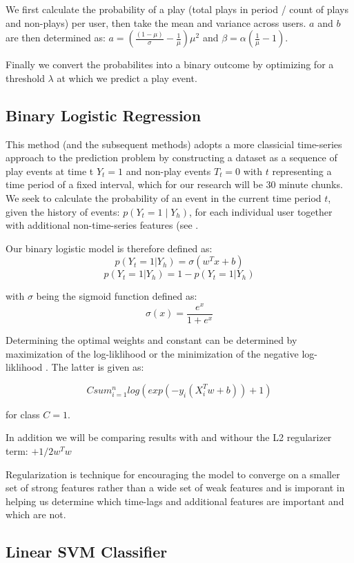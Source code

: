 We first calculate the probability of a play (total plays in period / count of plays and non-plays) per user, then take the mean and variance across users. $a$ and $b$ are then determined as:
$a = (\frac{(1- \mu)}{\sigma} - \frac{1}{\mu}) \mu^2$
and
$\beta=\alpha\left(\frac{1}{\mu}-1\right)$.

Finally we convert the probabilites into a binary outcome by optimizing for a threshold $\lambda$ at which we predict a play event.

\subsection{Binary Logistic Regression}

This method (and the subsequent methods) adopts a more classicial time-series approach to the prediction problem by constructing a dataset as a sequence of play events at time t $Y_t = 1$ and non-play events $T_t = 0$ with $t$ representing a time period of a fixed interval, which for our research will be 30 minute chunks. We seek to calculate the probability of an event in the current time period $t$, given the history of events: $p(Y_t =1 \mid Y_h)$, for each individual user together with additional non-time-series features (see . 

Our binary logistic model is therefore defined as:
$$p(Y_t = 1|Y_h) = \sigma(w^Tx + b)$$
$$p(Y_t = 1|Y_h) = 1 - p(Y_t = 1|Y_h)$$

with $\sigma$ being the sigmoid function defined as:
$$\sigma(x)=\frac{e^x}{1+e^x}$$

Determining the optimal weights and constant can be determined by maximization of the log-liklihood or the minimization of the negative log-liklihood \parencite{NegLog}. The latter is given as:

$$Csum^n_{i=1}log(exp(-y_i(X^T_iw+b))+1)$$

for class $C = 1$.

In addition we will be comparing results with and withour the L2 regularizer term:
 $ + 1/2w^Tw$

Regularization is technique for encouraging the model to converge on a smaller set of strong features rather than a wide set of weak features and is imporant in helping us determine which time-lags and additional features are important and which are not.

\subsection{Linear SVM Classifier}

